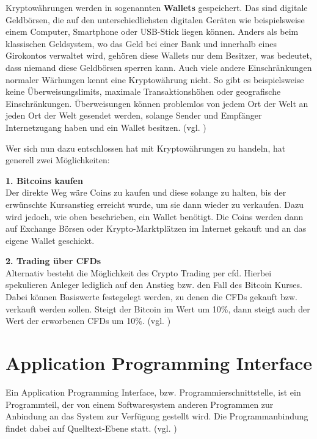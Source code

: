 \documentclass[oneside]{ausarbeitung}
\begin{document}
Kryptowährungen werden in sogenannten \textbf{Wallets} gespeichert. Das sind digitale Geldbörsen, die auf den unterschiedlichsten digitalen Geräten wie beispielsweise einem Computer, Smartphone oder USB-Stick liegen können. Anders als beim klassischen Geldsystem, wo das Geld bei einer Bank und innerhalb eines Girokontos verwaltet wird, gehören diese Wallets nur dem Besitzer, was bedeutet, dass niemand diese Geldbörsen sperren kann. Auch viele andere Einschränkungen normaler Wärhungen kennt eine Kryptowährung nicht. So gibt es beispielsweise keine Überweisungslimits, maximale Transaktionshöhen oder geografische Einschränkungen. Überweisungen können problemlos von jedem Ort der Welt an jeden Ort der Welt gesendet werden, solange Sender und Empfänger Internetzugang haben und ein Wallet besitzen. (vgl. \cite{bitcoins_erklärung})

Wer sich nun dazu entschlossen hat mit Kryptowährungen zu handeln, hat generell zwei Möglichkeiten:

\textbf{1. Bitcoins kaufen} \\
Der direkte Weg wäre Coins zu kaufen und diese solange zu halten, bis der erwünschte Kursanstieg erreicht wurde, um sie dann wieder zu verkaufen. Dazu wird jedoch, wie oben beschrieben, ein Wallet benötigt. Die Coins werden dann auf Exchange Börsen oder Krypto-Marktplätzen im Internet gekauft und an das eigene Wallet geschickt. 

\textbf{2. Trading über CFDs} \\
Alternativ besteht die Möglichkeit des Crypto Trading per \ac{cfd}. Hierbei spekulieren Anleger lediglich auf den Anstieg bzw. den Fall des Bitcoin Kurses. Dabei können Basiswerte festegelegt werden, zu denen die CFDs gekauft bzw. verkauft werden sollen. Steigt der Bitcoin im Wert um 10\%, dann steigt auch der Wert der erworbenen CFDs um 10\%. (vgl. \cite{crypto_trading})


\section{Application Programming Interface}
\label{sec:api}

Ein Application Programming Interface, bzw. Programmierschnittstelle, ist ein Programmteil, der von einem Softwaresystem anderen Programmen zur Anbindung an das System zur Verfügung gestellt wird. Die Programmanbindung findet dabei auf Quelltext-Ebene statt. (vgl. \cite{api_definition})
\end{document}

